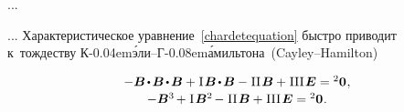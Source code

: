\begin{otherlanguage}{russian}
...



... Характеристическое уравнение~\eqref{chardetequation} быстро приводит к~тождеству К\kern-0.04em\'{э}ли\hbox{--}Г\kern-0.08em\'{а}мильтона~(Cayley\hbox{--}Hamilton)

\nopagebreak\vspace{-0.2em}\begin{equation}\label{cayley-hamilton:eq}
\begin{array}{c}
-\bm{B} \hspace{-0.2ex} \dotp \hspace{-0.2ex} \bm{B} \hspace{-0.2ex} \dotp \hspace{-0.2ex} \bm{B}
+ \hspace{.1ex} \mathrm{I} \hspace{.2ex} \bm{B} \hspace{-0.2ex} \dotp \hspace{-0.2ex} \bm{B}
- \hspace{.1ex} \mathrm{II} \hspace{.2ex} \bm{B}
+ \hspace{.1ex} \mathrm{III} \hspace{.2ex} \UnitDyad
= {^2\bm{0}}
\hspace{.1ex} ,
\\[.16em]
-\bm{B}^{3} \hspace{-0.2ex}
+ \hspace{.1ex} \mathrm{I} \hspace{.2ex} \bm{B}^{2} \hspace{-0.2ex}
- \hspace{.1ex} \mathrm{II} \hspace{.2ex} \bm{B}
+ \hspace{.1ex} \mathrm{III} \hspace{.2ex} \UnitDyad
= {^2\bm{0}}
\hspace{.1ex} .
\end{array}
\end{equation}

\end{otherlanguage}



